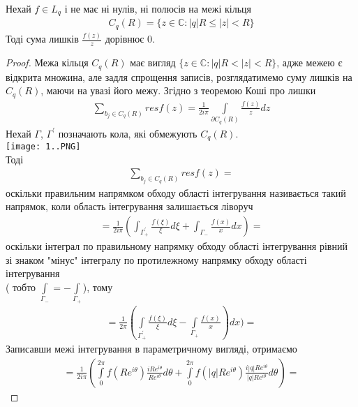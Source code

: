 \documentclass[12pt,a4paper]{article}
\begin{document}
 
\begin{thm}
 Нехай $f\in L_{q}$ і не має ні нулів, ні полюсів на межі кільця 
\begin{equation}\label{th21}
\begin{array}{l}
C_{q}(R)=\lbrace z\in \mathbb{C}:\left |q  \right |R\leq \left |z  \right |<R \rbrace
\end{array}
\end{equation} 
 Тоді сума лишків $\frac{f(z)}{z}$ дорівнює $0$.
\end{thm}
\begin{proof}
 Межа кільця $C_{q}(R)$ має вигляд $\lbrace z\in \mathbb{C}:\left |q  \right |R< \left |z  \right |<R \rbrace$, адже межею є відкрита множина, але задля спрощення записів, розглядатимемо суму лишків на $C_{q}(R)$, маючи на увазі його межу. Згідно з теоремою Коші про лишки
 \[\begin{array}{l}
\sum \limits_{ b_{j}\in C_{q}(R)} resf(z)= \frac{1}{2i\pi}\int \limits_{\partial C_{q}(R)} \frac{f(z)}{z}dz
\end{array} \]
Нехай $\Gamma$, $\Gamma^{'}$ позначають кола, які обмежують $C_{q}(R)$.\\
\texttt{[image: 1..PNG]}\\
Тоді 
\[\begin{array}{l}
\sum_{b_{j} \in C_{q}(R)}^{ } resf(z) = 
\end{array} \]
оскільки правильним напрямком обходу області інтегрування називається такий
напрямок, коли область інтегрування залишається ліворуч 
\[\begin{array}{l}
= \frac{1}{2i\pi} (\int_{\Gamma^{'}_{+}}^{ }\frac{f(\xi)}{\xi}d\xi  + \int_{\Gamma_{-}}^{ }\frac{f(x)}{x}dx)=
\end{array} \]
оскільки інтеграл по правильному напрямку обходу області інтегрування рівний зі знаком "мінус" інтегралу по протилежному напрямку обходу області інтегрування\\
( тобто $\int\limits_{\Gamma_{-}}= - \int\limits_{\Gamma_{+}}$), тому 
\[\begin{array}{l}
=\frac{1}{2\pi}(\int\limits_{\Gamma^{'}_{+}} \frac{f(\xi)}{\xi}d\xi - \int\limits_{\Gamma_{+}}\frac{f(x)}{x})dx)=
\end{array} \]
 Записавши межі інтегрування в параметричному вигляді, отримаємо 
 \[\begin{array}{l}
 = \frac{1}{2i\pi}(\int\limits_{0}^{2\pi }f(Re^{i\theta})\frac{iRe^{i\theta}}{Re^{i\theta }}d\theta  + \int\limits_{0}^{2\pi }f(\left |q \right |Re^{i\theta })\frac{i\left |q \right |Re^{i\theta }}{\left |q \right |Re^{i\theta }}d\theta)=

\end{array}\]
\end{proof}
\end{document}
